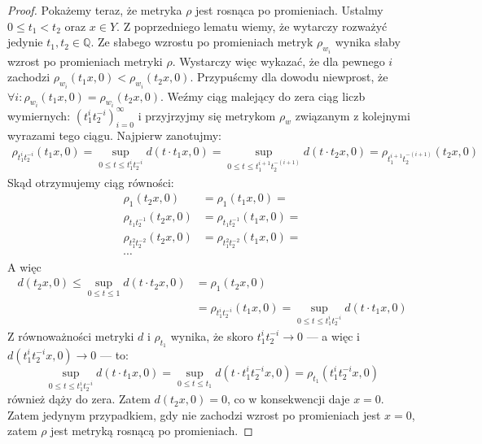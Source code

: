 \begin{thm}
\begin{proof}
    Pokażemy teraz, że metryka $\rho$ jest rosnąca po promieniach. Ustalmy $0 \leq t_1 < t_2$ oraz $x \in Y$. Z poprzedniego lematu wiemy, że wytarczy rozważyć jedynie $t_1, t_2 \in \mathbb{Q}$. Ze słabego wzrostu po promieniach metryk $\rho_{w_i}$ wynika słaby wzrost po promieniach metryki $\rho$. Wystarczy więc wykazać, że dla pewnego $i$ zachodzi $\rho_{w_i}(t_1 x, 0) < \rho_{w_i}(t_2 x, 0)$. Przypuścmy dla dowodu niewprost, że $\forall i: \rho_{w_i}(t_1 x, 0) = \rho_{w_i}(t_2 x, 0)$. Weźmy ciąg malejący do zera ciąg liczb wymiernych: $(t_1^i t_2^{-i})_{i=0}^\infty$ i przyjrzyjmy się metrykom $\rho_w$ związanym z kolejnymi wyrazami tego ciągu. Najpierw zanotujmy:
    \begin{align*}
      \rho_{t_1^i t_2^{-i}}(t_1 x, 0) = \sup_{0 \leq t \leq t_1^i t_2^{-i}} d(t \cdot t_1 x, 0) =
      \sup_{0 \leq t \leq t_1^{i+1} t_2^{-(i+1)}} d(t \cdot t_2 x, 0) = \rho_{t_1^{i+1} t_2^{-(i+1)}}(t_2 x, 0)
    \end{align*}
    Skąd otrzymujemy ciąg równości:
    \begin{align*}
      \rho_1(t_2 x, 0) &= \rho_1(t_1 x, 0) = \\
      \rho_{t_1 t_2^{-1}}(t_2 x, 0) &= \rho_{t_1 t_2^{-1}}(t_1 x, 0) = \\
      \rho_{t_1^2 t_2^{-2}}(t_2 x, 0) &= \rho_{t_1^2 t_2^{-2}}(t_1 x, 0) = \\
      \cdots
    \end{align*}
    A więc
    \begin{align*}
      d(t_2 x, 0) \leq \sup_{0 \leq t \leq 1} d(t \cdot t_2 x, 0) &= \rho_1(t_2 x, 0) \\
      &= \rho_{t_1^i t_2^{-i}}(t_1 x, 0) = \sup_{0 \leq t \leq t_1^i t_2^{-i}} d(t \cdot t_1 x, 0)
    \end{align*}
    Z równoważności metryki $d$ i $\rho_{t_1}$ wynika, że skoro $t_1^i t_2^{-i} \to 0$ --- a więc i $d(t_1^i t_2^{-i} x, 0) \to 0$ --- to:
    \[
      \sup_{0 \leq t \leq t_1^i t_2^{-i}} d(t \cdot t_1 x, 0)
      = \sup_{0 \leq t \leq t_1} d(t \cdot t_1^i t_2^{-i} x, 0)
      = \rho_{t_1}(t_1^i t_2^{-i} x, 0)
    \]
    również dąży do zera. Zatem $d(t_2 x, 0) = 0$, co w konsekwencji daje $x = 0$. Zatem jedynym przypadkiem, gdy nie zachodzi wzrost po promieniach jest $x = 0$, zatem $\rho$ jest metryką rosnącą po promieniach.
  \end{proof}
\end{thm}

